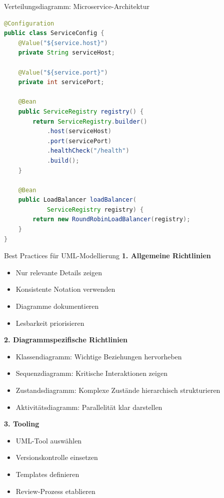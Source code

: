 \begin{example2}{Verteilungsdiagramm: Microservice-Architektur}
\begin{lstlisting}[language=Java, style=basesmol]
@Configuration
public class ServiceConfig {
    @Value("${service.host}")
    private String serviceHost;
    
    @Value("${service.port}")
    private int servicePort;
    
    @Bean
    public ServiceRegistry registry() {
        return ServiceRegistry.builder()
            .host(serviceHost)
            .port(servicePort)
            .healthCheck("/health")
            .build();
    }
    
    @Bean
    public LoadBalancer loadBalancer(
            ServiceRegistry registry) {
        return new RoundRobinLoadBalancer(registry);
    }
}
\end{lstlisting}
\end{example2}

\begin{KR}{Best Practices für UML-Modellierung}
\textbf{1. Allgemeine Richtlinien}
\begin{itemize}
    \item Nur relevante Details zeigen
    \item Konsistente Notation verwenden
    \item Diagramme dokumentieren
    \item Lesbarkeit priorisieren
\end{itemize}

\textbf{2. Diagrammspezifische Richtlinien}
\begin{itemize}
    \item Klassendiagramm: Wichtige Beziehungen hervorheben
    \item Sequenzdiagramm: Kritische Interaktionen zeigen
    \item Zustandsdiagramm: Komplexe Zustände hierarchisch strukturieren
    \item Aktivitätsdiagramm: Parallelität klar darstellen
\end{itemize}

\textbf{3. Tooling}
\begin{itemize}
    \item UML-Tool auswählen
    \item Versionskontrolle einsetzen
    \item Templates definieren
    \item Review-Prozess etablieren
\end{itemize}
\end{KR}


